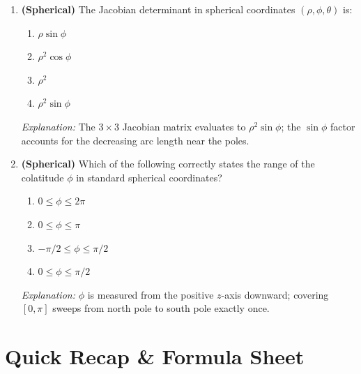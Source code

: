\documentclass[12pt,a4paper]{article}
\begin{document}
\begin{enumerate}[label=\textbf{MCQ\arabic*.}, leftmargin=2.5em]
\item \textbf{(Spherical)} The Jacobian determinant in spherical coordinates $(\rho, \phi, \theta)$ is:
  \begin{enumerate}[label=(\Alph*)]
    \item $\rho\sin\phi$
    \item $\rho^2\cos\phi$
    \item $\rho^2$
    \item \textbf{$\rho^2\sin\phi$}
  \end{enumerate}
  \textit{Explanation:} The $3\times3$ Jacobian matrix evaluates to $\rho^2\sin\phi$; the $\sin\phi$
  factor accounts for the decreasing arc length near the poles.

\item \textbf{(Spherical)} Which of the following correctly states the range of the colatitude $\phi$
  in standard spherical coordinates?
  \begin{enumerate}[label=(\Alph*)]
    \item $0 \leq \phi \leq 2\pi$
    \item \textbf{$0 \leq \phi \leq \pi$}
    \item $-\pi/2 \leq \phi \leq \pi/2$
    \item $0 \leq \phi \leq \pi/2$
  \end{enumerate}
  \textit{Explanation:} $\phi$ is measured from the positive $z$-axis downward; covering $[0,\pi]$
  sweeps from north pole to south pole exactly once.

\end{enumerate}

\section{Quick Recap \& Formula Sheet}
\end{document}
